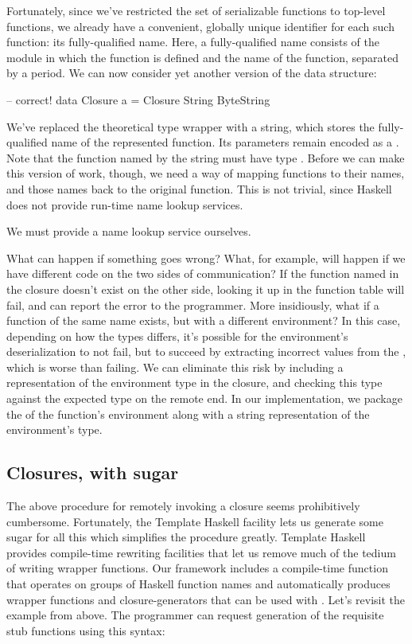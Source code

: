 \documentclass[preprint]{sigplanconf}
\begin{document}
Fortunately, since we've restricted the set of serializable functions to top-level functions, we already have a convenient, globally unique identifier for each such function: its fully-qualified name. Here, a fully-qualified name consists of the module in which the function is defined and the name of the function, separated by a period. We can now consider yet another version of the  data structure:

\begin{code}
-- correct!
data Closure a = Closure String ByteString
\end{code}

We've replaced the theoretical  type wrapper with a string, which stores the fully-qualified name of the represented function. Its parameters remain encoded as a . Note that the function named by the string must have type . Before we can make this version of  work, though, we need a way of mapping functions to their names, and those names back to the original function. This is not trivial, since Haskell does not provide run-time name lookup services.

We must provide a name lookup service ourselves. 



What can happen if something goes wrong? What, for example, will happen if we have different code on the two sides of communication? If the function named in the closure doesn't exist on the other side, looking it up in the function table will fail, and  can report the error to the programmer. More insidiously, what if a function of the same name exists, but with a different environment? In this case, depending on how the types differs, it's possible for the environment's deserialization to not fail, but to succeed by extracting incorrect values from the , which is worse than failing. We can eliminate this risk by including a representation of the environment type in the closure, and checking this type against the expected type on the remote end. In our implementation, we package the  of the function's environment along with a string representation of the environment's type.


\subsection{Closures, with sugar}

The above procedure for remotely invoking a closure seems prohibitively cumbersome. Fortunately, the Template Haskell facility lets us generate some sugar for all this which simplifies the procedure greatly. Template Haskell provides compile-time rewriting facilities that let us remove much of the tedium of writing wrapper functions. Our framework includes a compile-time  function that operates on groups of Haskell function names and automatically produces wrapper functions and closure-generators that can be used with . Let's revisit the  example from above. The programmer can request generation of the requisite stub functions using this syntax:
\end{document}
